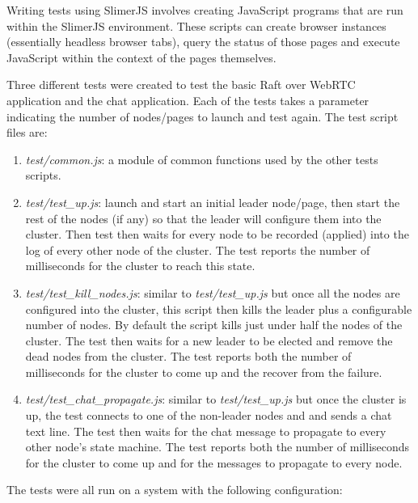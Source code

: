 \documentclass[9pt]{extarticle}
\begin{document}
\begin{multicols}{2}
Writing tests using SlimerJS involves creating JavaScript programs
that are run within the SlimerJS environment. These scripts can create
browser instances (essentially headless browser tabs), query the status
of those pages and execute JavaScript within the context of the pages
themselves.

Three different tests were created to test the basic Raft over WebRTC
application and the chat application. Each of the tests takes
a parameter indicating the number of nodes/pages to launch and test
again. The test script files are:

\begin{enumerate}
    \item \emph{test/common.js}: a module of common functions used by
        the other tests scripts.
    \item \emph{test/test\_up.js}: launch and start an initial leader
        node/page, then start the rest of the nodes (if any) so that
        the leader will configure them into the cluster. Then test
        then waits for every node to be recorded (applied) into the log
        of every other node of the cluster. The test reports the
        number of milliseconds for the cluster to reach this state.
    \item \emph{test/test\_kill\_nodes.js}: similar to
        \emph{test/test\_up.js} but once all the nodes are configured
        into the cluster, this script then kills the leader plus
        a configurable number of nodes. By default the script kills
        just under half the nodes of the cluster. The test then waits
        for a new leader to be elected and remove the dead nodes from
        the cluster. The test reports both the number of milliseconds
        for the cluster to come up and the recover from the failure.
    \item \emph{test/test\_chat\_propagate.js}: similar to
        \emph{test/test\_up.js} but once the cluster is up, the test
        connects to one of the non-leader nodes and and sends a chat
        text line. The test then waits for the chat message to
        propagate to every other node's state machine. The test
        reports both the number of milliseconds for the cluster to
        come up and for the messages to propagate to every node.
\end{enumerate}

The tests were all run on a system with the following configuration:


\end{multicols}
\end{document}

